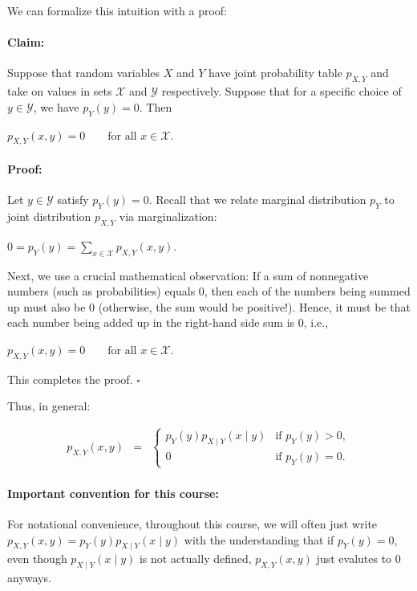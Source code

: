 \documentclass[6008notes.tex]{subfiles}
\begin{document}
We can formalize this intuition with a proof:

\paragraph{Claim:} Suppose that random variables $X$ and $Y$ have joint probability table $p_{X,Y}$ and take on values in sets $\mathcal{X}$ and $\mathcal{Y}$ respectively. Suppose that for a specific choice of $y\in \mathcal{Y}$, we have $p_{Y}(y)=0$. Then

$p_{X,Y}(x,y)=0\qquad \text {for all }x\in \mathcal{X}.$
 
\paragraph{Proof:} Let $y\in \mathcal{Y}$ satisfy $p_{Y}(y)=0$. Recall that we relate marginal distribution $p_Y$ to joint distribution $p_{X,Y}$ via marginalization:

$0=p_{Y}(y)=\sum _{x\in \mathcal{X}}p_{X,Y}(x,y).$
 
Next, we use a crucial mathematical observation: If a sum of nonnegative numbers (such as probabilities) equals 0, then each of the numbers being summed up must also be 0 (otherwise, the sum would be positive!). Hence, it must be that each number being added up in the right-hand side sum is 0, i.e.,

$p_{X,Y}(x,y)=0\qquad \text {for all }x\in \mathcal{X}.$
 
This completes the proof. $\square$

Thus, in general:

\begin{eqnarray*}
p_{X,Y}(x,y)
&=&
\begin{cases}
p_{Y}(y)p_{X\mid Y}(x\mid y) & \text{if }p_{Y}(y)>0,\\
0 & \text{if }p_{Y}(y)=0.
\end{cases}
\end{eqnarray*}

\paragraph{Important convention for this course:} For notational convenience, throughout this course, we will often just write $p_{X,Y}(x,y)=p_{Y}(y)p_{X\mid Y}(x\mid y)$ with the understanding that if $p_{Y}(y)=0$, even though $p_{X\mid Y}(x\mid y)$ is not actually defined, $p_{X,Y}(x,y)$ just evalutes to 0 anyways.
\end{document}
